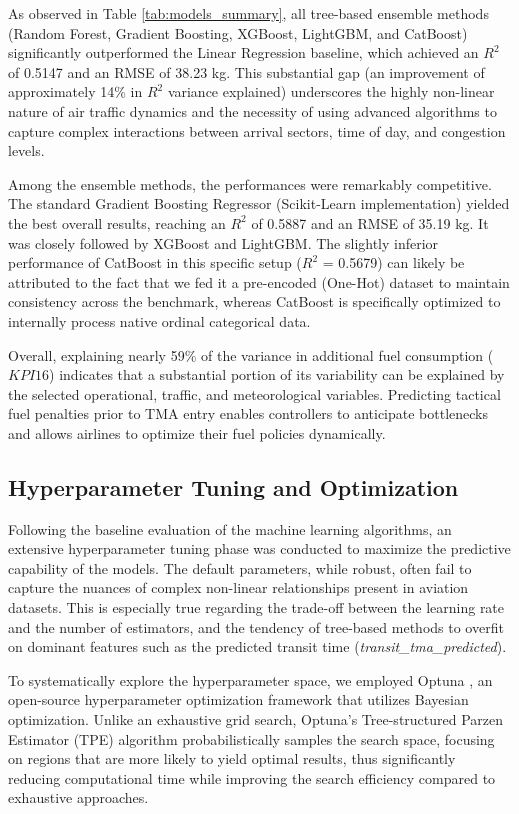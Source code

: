 As observed in Table \ref{tab:models_summary}, all tree-based ensemble methods (Random Forest, Gradient Boosting, XGBoost, LightGBM, and CatBoost) significantly outperformed the Linear Regression baseline, which achieved an $R^2$ of 0.5147 and an RMSE of 38.23 kg. This substantial gap (an improvement of approximately 14\% in $R^2$ variance explained) underscores the highly non-linear nature of air traffic dynamics and the necessity of using advanced algorithms to capture complex interactions between arrival sectors, time of day, and congestion levels.

Among the ensemble methods, the performances were remarkably competitive. The standard Gradient Boosting Regressor (Scikit-Learn implementation) yielded the best overall results, reaching an $R^2$ of 0.5887 and an RMSE of 35.19 kg. It was closely followed by XGBoost and LightGBM. The slightly inferior performance of CatBoost in this specific setup ($R^2$ = 0.5679) can likely be attributed to the fact that we fed it a pre-encoded (One-Hot) dataset to maintain consistency across the benchmark, whereas CatBoost is specifically optimized to internally process native ordinal categorical data.

Overall, explaining nearly 59\% of the variance in additional fuel consumption ($KPI16$) indicates that a substantial portion of its variability can be explained by the selected operational, traffic, and meteorological variables. Predicting tactical fuel penalties prior to TMA entry enables controllers to anticipate bottlenecks and allows airlines to optimize their fuel policies dynamically.

\subsection{Hyperparameter Tuning and Optimization}
Following the baseline evaluation of the machine learning algorithms, an extensive hyperparameter tuning phase was conducted to maximize the predictive capability of the models. The default parameters, while robust, often fail to capture the nuances of complex non-linear relationships present in aviation datasets. This is especially true regarding the trade-off between the learning rate and the number of estimators, and the tendency of tree-based methods to overfit on dominant features such as the predicted transit time (\textit{transit\_tma\_predicted}).

To systematically explore the hyperparameter space, we employed Optuna \cite{akiba2019optuna}, an open-source hyperparameter optimization framework that utilizes Bayesian optimization. Unlike an exhaustive grid search, Optuna's Tree-structured Parzen Estimator (TPE) algorithm probabilistically samples the search space, focusing on regions that are more likely to yield optimal results, thus significantly reducing computational time while improving the search efficiency compared to exhaustive approaches.

